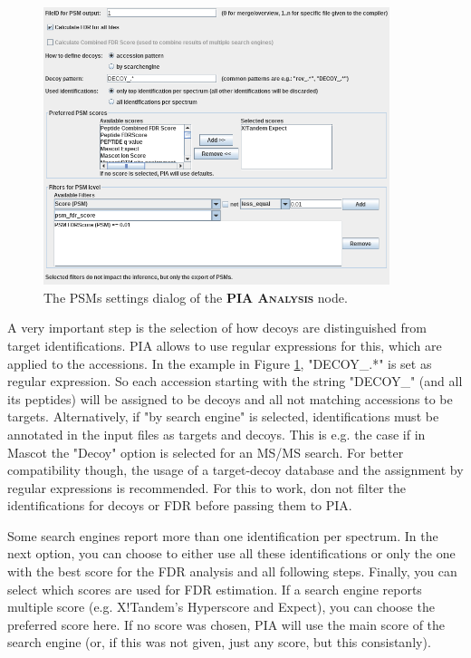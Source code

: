 \documentclass[a4paper,11pt,twoside]{article}
\newcommand{\knimenode}[1]{{\scshape\bfseries #1}}
\begin{document}
\begin{figure}[ht!]
	\centering
	\includegraphics[width=0.9\textwidth]{graphics/pia_settings_psms}
	\caption{The PSMs settings dialog of the \knimenode{PIA Analysis} node.}
	\label{pia_settings_psms}
\end{figure}

A very important step is the selection of how decoys are distinguished from
target identifications. PIA allows to use regular expressions for this, which
are applied to the accessions. In the example in Figure
\ref{pia_settings_psms}, "DECOY\_.*" is set as regular expression. So each
accession starting with the string "DECOY\_" (and all its peptides) will be
assigned to be decoys and all not matching accessions to be targets.
Alternatively, if "by search engine" is selected, identifications must be
annotated in the input files as targets and decoys. This is e.g. the case if in
Mascot the "Decoy" option is selected for an MS/MS search. For better
compatibility though, the usage of a target-decoy database and the assignment
by regular expressions is recommended. For this to work, don not filter the
identifications for decoys or FDR before passing them to PIA.

Some search engines report more than one identification per spectrum. In the
next option, you can choose to either use all these identifications or only the
one with the best score for the FDR analysis and all following steps. Finally,
you can select which scores are used for FDR estimation. If a search engine
reports multiple score (e.g. X!Tandem's Hyperscore and Expect), you can choose
the preferred score here. If no score was chosen, PIA will use the main score of
the search engine (or, if this was not given, just any score, but this
consistanly).
\end{document}
